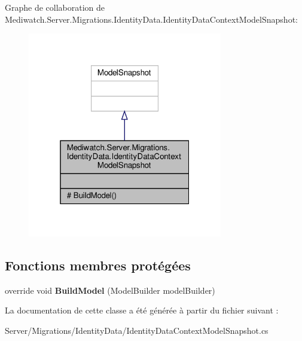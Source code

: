 Graphe de collaboration de Mediwatch.\+Server.\+Migrations.\+Identity\+Data.\+Identity\+Data\+Context\+Model\+Snapshot\+:
\nopagebreak
\begin{figure}[H]
\begin{center}
\leavevmode
\includegraphics[width=241pt]{class_mediwatch_1_1_server_1_1_migrations_1_1_identity_data_1_1_identity_data_context_model_snapshot__coll__graph}
\end{center}
\end{figure}
\subsection*{Fonctions membres protégées}
\begin{DoxyCompactItemize}
\item 
\mbox{\label{class_mediwatch_1_1_server_1_1_migrations_1_1_identity_data_1_1_identity_data_context_model_snapshot_ace9e9c05682cf740c45eeef4862fa09d}} 
override void {\bfseries Build\+Model} (Model\+Builder model\+Builder)
\end{DoxyCompactItemize}


La documentation de cette classe a été générée à partir du fichier suivant \+:\begin{DoxyCompactItemize}
\item 
Server/\+Migrations/\+Identity\+Data/Identity\+Data\+Context\+Model\+Snapshot.\+cs\end{DoxyCompactItemize}
